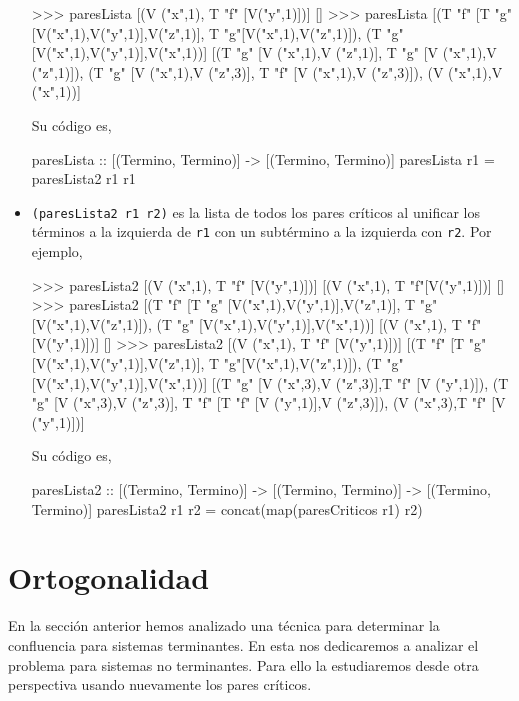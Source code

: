 \begin{itemize}
\begin{sesion}
>>> paresLista [(V ("x",1), T "f" [V("y",1)])]
[]
>>> paresLista [(T "f" [T "g" [V("x",1),V("y",1)],V("z",1)],
                 T "g"[V("x",1),V("z",1)]),
                (T "g" [V("x",1),V("y",1)],V("x",1))]
[(T "g" [V ("x",1),V ("z",1)], T "g" [V ("x",1),V ("z",1)]),
 (T "g" [V ("x",1),V ("z",3)], T "f" [V ("x",1),V ("z",3)]),
 (V ("x",1),V ("x",1))]
\end{sesion}

Su código es,

\begin{codigo}
paresLista :: [(Termino, Termino)] -> [(Termino, Termino)]
paresLista r1 = paresLista2 r1 r1
\end{codigo}

\item \texttt{(paresLista2 r1 r2)} es la lista de todos los pares
  críticos al unificar los términos a la izquierda de \texttt{r1} con un
  subtérmino a la izquierda con \texttt{r2}. Por ejemplo,

\begin{sesion}
>>> paresLista2 [(V ("x",1), T "f" [V("y",1)])]
                [(V ("x",1), T "f"[V("y",1)])]
[]
>>> paresLista2 [(T "f" [T "g" [V("x",1),V("y",1)],V("z",1)],
                  T "g"[V("x",1),V("z",1)]),
                 (T "g" [V("x",1),V("y",1)],V("x",1))]
                [(V ("x",1), T "f" [V("y",1)])] 
[]
>>> paresLista2 [(V ("x",1), T "f" [V("y",1)])] 
                [(T "f" [T "g" [V("x",1),V("y",1)],V("z",1)],
                  T "g"[V("x",1),V("z",1)]),
                  (T "g" [V("x",1),V("y",1)],V("x",1))]
[(T "g" [V ("x",3),V ("z",3)],T "f" [V ("y",1)]),
 (T "g" [V ("x",3),V ("z",3)],
  T "f" [T "f" [V ("y",1)],V ("z",3)]),
 (V ("x",3),T "f" [V ("y",1)])]
\end{sesion}

Su código es,

\begin{codigo}
paresLista2 :: [(Termino, Termino)] -> [(Termino, Termino)]
               -> [(Termino, Termino)]
paresLista2 r1 r2 = concat(map(paresCriticos r1) r2)
\end{codigo}

\end{itemize}

\section{Ortogonalidad}

En la sección anterior hemos analizado una técnica para determinar la
confluencia para sistemas terminantes. En esta nos dedicaremos a
analizar el problema para sistemas no terminantes. Para ello la
estudiaremos desde otra perspectiva usando nuevamente los pares
críticos.

